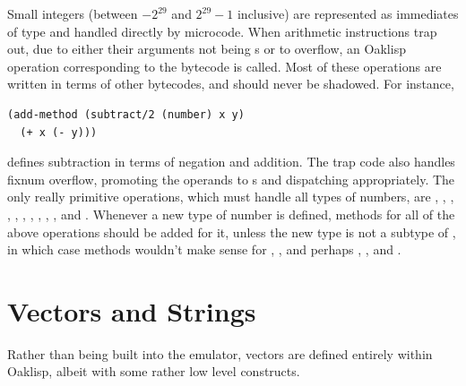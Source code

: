 Small integers (between $-2^{29}$ and $2^{29}-1$ inclusive) are
represented as immediates of type  and handled directly by
microcode.  When arithmetic instructions trap out, due to either their
arguments not being s or to overflow, an Oaklisp operation
corresponding to the bytecode is called.  Most of these operations are
written in terms of other bytecodes, and should never be shadowed.
For instance,
\begin{verbatim}
(add-method (subtract/2 (number) x y)
  (+ x (- y)))
\end{verbatim}
defines subtraction in terms of negation and addition.  The trap code
also handles fixnum overflow, promoting the operands to s
and dispatching appropriately.  The only really primitive operations,
which must handle all types of numbers, are \df{<}, \df{=},
 , , , , \df{/},
 , , ,  and
 .  Whenever a new type of number is defined, methods for
all of the above operations should be added for it, unless the new
type is not a subtype of , in which case methods wouldn't
make sense for \df{<}, , and perhaps ,
 ,  and .



\section{Vectors and Strings}

Rather than being built into the emulator, vectors are defined
entirely within Oaklisp, albeit with some rather low level constructs.




